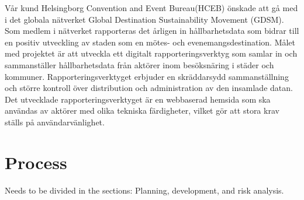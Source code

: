 \documentclass[12pt]{article}
\begin{document}
Vår kund Helsingborg Convention and Event Bureau(HCEB) önskade att gå med i det globala nätverket Global Destination Sustainability Movement (GDSM). Som medlem i nätverket rapporteras det årligen in hållbarhetsdata som bidrar till en positiv utveckling av staden som en mötes- och evenemangsdestination. Målet med projektet är att utveckla ett digitalt rapporteringsverktyg som samlar in och sammanställer hållbarhetsdata från aktörer inom besöksnäring i städer och kommuner. Rapporteringsverktyget erbjuder en skräddarsydd sammanställning och större kontroll över distribution och administration av den insamlade datan. Det utvecklade rapporteringsverktyget är en webbaserad hemsida som ska användas av aktörer med olika tekniska färdigheter, vilket gör att stora krav ställs på användarvänlighet.





\section{Process}
Needs to be divided in the sections: Planning, development, and risk analysis.
\end{document}
